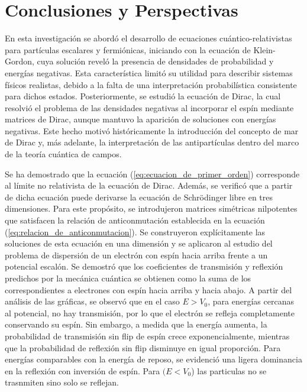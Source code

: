 \chapter{Conclusiones y Perspectivas}\label{cap.5}
%
%
En esta investigación se abordó el desarrollo de ecuaciones cuántico-relativistas para partículas escalares y fermiónicas, iniciando con la ecuación de Klein-Gordon, cuya solución reveló la presencia de densidades de probabilidad y energías negativas. Esta característica limitó su utilidad para describir sistemas físicos realistas, debido a la falta de una interpretación probabilística consistente para dichos estados. Posteriormente, se estudió la ecuación de Dirac, la cual resolvió el problema de las densidades negativas al incorporar el espín mediante matrices de Dirac, aunque mantuvo la aparición de soluciones con energías negativas. Este hecho motivó históricamente la introducción del concepto de mar de Dirac y, más adelante, la interpretación de las antipartículas dentro del marco de la teoría cuántica de campos.

Se ha demostrado que la ecuación (\ref{eq:ecuacion_de_primer_orden}) corresponde al límite no relativista de la ecuación de Dirac. Además, se verificó que a partir de dicha ecuación puede derivarse la ecuación de Schrödinger libre en tres dimensiones. Para este propósito, se introdujeron matrices simétricas nilpotentes que satisfacen la relación de anticonmutación establecida en la ecuación (\ref{eq:relacion_de_anticonmutacion}). Se construyeron explícitamente las soluciones de esta ecuación en una dimensión y se aplicaron al estudio del problema de dispersión de un electrón con espín hacia arriba frente a un potencial escalón. Se demostró que los coeficientes de transmisión y reflexión predichos por la mecánica cuántica se obtienen como la suma de los correspondientes a electrones con espín hacia arriba y hacia abajo. A partir del análisis de las gráficas, se observó que en el caso \(E > V_0\), para energías cercanas al potencial, no hay transmisión, por lo que el electrón se refleja completamente conservando su espín. Sin embargo, a medida que la energía aumenta, la probabilidad de transmisión sin flip de espín crece exponencialmente, mientras que la probabilidad de reflexión sin flip disminuye en igual proporción. Para energías comparables con la energía de reposo, se evidenció una ligera dominancia en la reflexión con inversión de espín. Para \((E<V_0\)) las particulas no se trasnmiten sino solo se reflejan.

